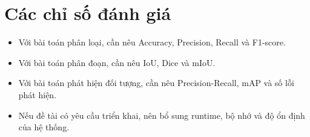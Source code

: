 \section{Các chỉ số đánh giá}
\begin{itemize}
    \item Với bài toán phân loại, cần nêu Accuracy, Precision, Recall và F1-score.
    \item Với bài toán phân đoạn, cần nêu IoU, Dice và mIoU.
    \item Với bài toán phát hiện đối tượng, cần nêu Precision-Recall, mAP và số lỗi phát hiện.
    \item Nếu đề tài có yêu cầu triển khai, nên bổ sung runtime, bộ nhớ và độ ổn định của hệ thống.
\end{itemize}

